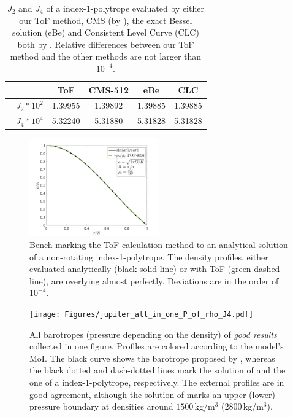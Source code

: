 \documentclass[usenatbib]{mnras}
\begin{document}
\begin{table}
\centering
 \begin{tabular}{r| c c c c}
 & ToF & CMS-512 & eBe & CLC \\
 \hline
$J_2*10^2$ & 1.39955 & 1.39892 & 1.39885 & 1.39885 \\
$-J_4*10^4$ & 5.32240 & 5.31880 & 5.31828 & 5.31828 \\
 \end{tabular}
\caption{$J_2$ and $J_4$ of a index-1-polytrope evaluated by either our ToF method, CMS (by \cite{Hubbard_2013}), the exact Bessel solution (eBe) and Consistent Level Curve (CLC) both by \cite{Wisdom_2016}. Relative differences between our ToF method and the other methods are not larger than $10^{-4}$.}
\label{tab:comp.J2J4}
\end{table}

\begin{figure}
    \centering
    \includegraphics[width = 0.5\textwidth]{Figures/test_non_rot_density_profile.png}
    \caption{Bench-marking the ToF calculation method to an analytical solution of a non-rotating index-1-polytrope. The density profiles, either evaluated analytically (black solid line) or with ToF (green dashed line), are overlying almost perfectly. Deviations are in the order of $10^{-4}$.}
    \label{fig:test_non_rot_density_profile}
\end{figure}

\begin{figure}
    \centering
    \texttt{[image: Figures/jupiter\_all\_in\_one\_P\_of\_rho\_J4.pdf]}
    \caption{All barotropes (pressure depending on the density) of \textit{good results} collected in one figure. Profiles are colored according to the model's MoI. The black curve shows the barotrope proposed by \cite{Miguel2016}, whereas the black dotted and dash-dotted lines mark the solution of \cite{Debras_2019} and the one of a index-1-polytrope, respectively. The external profiles are in good agreement, although the solution of \cite{Debras_2019} marks an upper (lower) pressure boundary at densities around $1500\,$kg/m$^3$ ($2800\,$kg/m$^3$). 
    }
    \label{fig:all_in_one_P_of_rho}
\end{figure}
\end{document}
